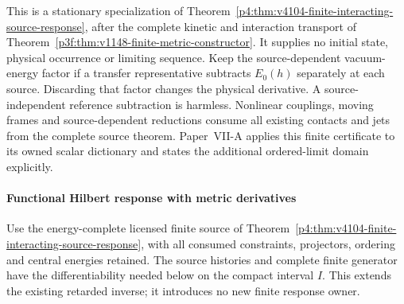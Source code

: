\documentclass[12pt,a4paper]{article}
\begin{document}
This is a stationary specialization of
Theorem~\ref{p4:thm:v4104-finite-interacting-source-response}, after
the complete kinetic and interaction transport of
Theorem~\ref{p3f:thm:v1148-finite-metric-constructor}.
It supplies no initial state, physical occurrence or limiting sequence.
Keep the source-dependent vacuum-energy factor if a transfer representative
subtracts $E_0(h)$ separately at each source. Discarding that factor changes
the physical derivative. A source-independent reference subtraction is
harmless. Nonlinear couplings, moving frames and source-dependent reductions
consume all existing contacts and jets from the complete source theorem.
Paper~VII-A applies this finite certificate to its owned scalar dictionary
and states the additional ordered-limit domain explicitly.




\paragraph{Functional Hilbert response with metric derivatives}
\label{p4:sec:v4106-functional-hilbert-response}
Use the energy-complete licensed finite source of
Theorem~\ref{p4:thm:v4104-finite-interacting-source-response}, with all
consumed constraints, projectors, ordering and central energies retained.
The source histories and complete finite generator have the differentiability
needed below on the compact interval $I$. This extends the existing
retarded inverse; it introduces no new finite response owner.
\end{document}
